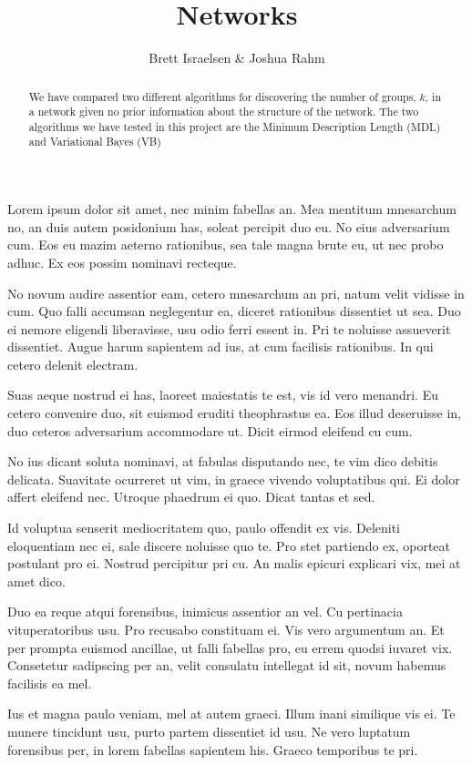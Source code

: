\documentclass[twocolumn,twoside]{IEEEtran}
\title{Networks}
\author{Brett Israelsen & Joshua Rahm}
\begin{document}
\maketitle

\begin{abstract}
We have compared two different algorithms for discovering
the number of groups, $k$, in a network given no prior information about the
structure of the network. The two algorithms we have tested in this project are
the Minimum Description Length (MDL) and Variational Bayes (VB)
\end{abstract}

Lorem ipsum dolor sit amet, nec minim fabellas an. Mea mentitum mnesarchum no,
an duis autem posidonium has, soleat percipit duo eu. No eius adversarium cum.
Eos eu mazim aeterno rationibus, sea tale magna brute eu, ut nec probo adhuc.
Ex eos possim nominavi recteque.

 No novum audire assentior eam, cetero mnesarchum an pri, natum velit vidisse
 in cum. Quo falli accumsan neglegentur ea, diceret rationibus dissentiet ut
 sea. Duo ei nemore eligendi liberavisse, usu odio ferri essent in. Pri te
 noluisse assueverit dissentiet. Augue harum sapientem ad ius, at cum facilisis
 rationibus. In qui cetero delenit electram.

 Suas aeque nostrud ei has, laoreet maiestatis te est, vis id vero menandri. Eu
 cetero convenire duo, sit euismod eruditi theophrastus ea. Eos illud
 deseruisse in, duo ceteros adversarium accommodare ut. Dicit eirmod eleifend
 cu cum.

 No ius dicant soluta nominavi, at fabulas disputando nec, te vim dico debitis
 delicata. Suavitate ocurreret ut vim, in graece vivendo voluptatibus qui. Ei
 dolor affert eleifend nec. Utroque phaedrum ei quo. Dicat tantas et sed.

 Id voluptua senserit mediocritatem quo, paulo offendit ex vis. Deleniti
 eloquentiam nec ei, sale discere noluisse quo te. Pro stet partiendo ex,
 oporteat postulant pro ei. Nostrud percipitur pri cu. An malis epicuri
 explicari vix, mei at amet dico.

 Duo ea reque atqui forensibus, inimicus assentior an vel. Cu pertinacia
 vituperatoribus usu. Pro recusabo constituam ei. Vis vero argumentum an. Et
 per prompta euismod ancillae, ut falli fabellas pro, eu errem quodsi iuvaret
 vix. Consetetur sadipscing per an, velit consulatu intellegat id sit, novum
 habemus facilisis ea mel.

 Ius et magna paulo veniam, mel at autem graeci. Illum inani similique vis ei.
 Te munere tincidunt usu, purto partem dissentiet id usu. Ne vero luptatum
 forensibus per, in lorem fabellas sapientem his. Graeco temporibus te pri.
\end{document}
